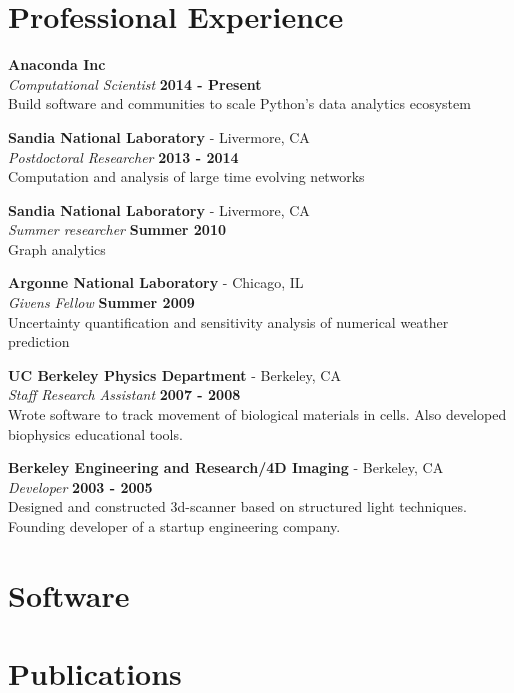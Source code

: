 \documentclass[margin,line]{res}
\begin{document}
\begin{resume}
\section{\sc Professional Experience}

{\bf Anaconda Inc} \\
{\em Computational Scientist} \hfill {\bf 2014 - Present}\\
Build software and communities to scale Python's data analytics ecosystem

{\bf Sandia National Laboratory } - Livermore, CA\\
{\em Postdoctoral Researcher} \hfill {\bf 2013 - 2014}\\
Computation and analysis of large time evolving networks

{\bf Sandia National Laboratory } - Livermore, CA\\
{\em Summer researcher} \hfill {\bf Summer 2010}\\
Graph analytics

{\bf Argonne National Laboratory} - Chicago, IL\\
{\em Givens Fellow} \hfill {\bf Summer 2009}\\
Uncertainty quantification and sensitivity analysis of numerical weather prediction

{\bf UC Berkeley Physics Department} - Berkeley, CA\\
{\em Staff Research Assistant} \hfill {\bf 2007 - 2008}\\
Wrote software to track movement of biological materials in cells.
Also developed biophysics educational tools.

{\bf Berkeley Engineering and Research/4D Imaging} - Berkeley, CA\\
{\em Developer} \hfill {\bf 2003 - 2005}\\
Designed and constructed 3d-scanner based on structured light techniques.
Founding developer of a startup engineering company.

\section{\sc Software}




\section{\sc Publications}




\end{resume}
\end{document}
